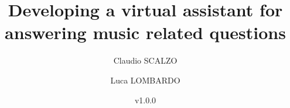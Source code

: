 \documentclass[a4paper,12pt]{book}
\begin{document}
\author{Claudio SCALZO \and Luca LOMBARDO}
\title{Developing a virtual assistant for answering music related questions}
\date{v1.0.0}

\frontmatter
\maketitle
\tableofcontents

\mainmatter




\backmatter
\end{document}
